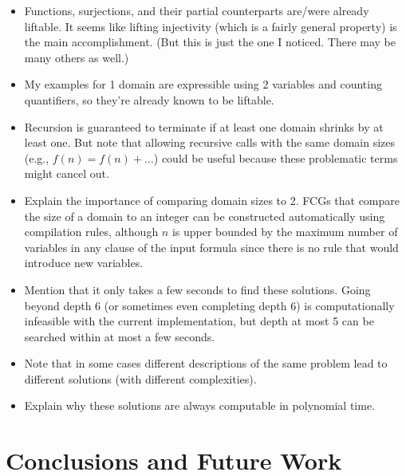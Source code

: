 \begin{itemize}
  \item Functions, surjections, and their partial counterparts are/were already
        liftable. It seems like lifting injectivity (which is a fairly general
        property) is the main accomplishment. (But this is just the one I
        noticed. There may be many others as well.)
  \item My examples for 1 domain are expressible using 2 variables and counting
        quantifiers, so they're already known to be liftable.
  \item Recursion is guaranteed to terminate if at least one domain shrinks by
        at least one. But note that allowing recursive calls with the same
        domain sizes (e.g., $f(n) = f(n) + \dots$) could be useful because these
        problematic terms might cancel out.
  \item Explain the importance of comparing domain sizes to 2. FCGs that compare
        the size of a domain to an integer can be constructed automatically
        using compilation rules, although $n$ is upper bounded by the maximum
        number of variables in any clause of the input formula since there is no
        rule that would introduce new variables.
  \item Mention that it only takes a few seconds to find these solutions. Going
        beyond depth 6 (or sometimes even completing depth 6) is computationally
        infeasible with the current implementation, but depth at most 5 can be
        searched within at most a few seconds.
  \item Note that in some cases different descriptions of the same problem lead
        to different solutions (with different complexities).
  \item Explain why these solutions are always computable in polynomial time.
\end{itemize}

\section{Conclusions and Future Work}

